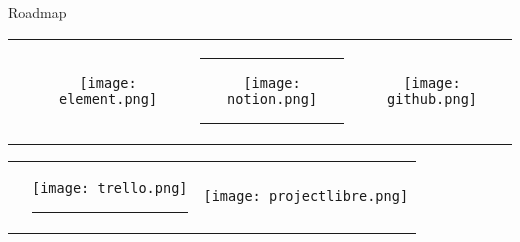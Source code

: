 \begin{frame}[c]{Roadmap}
    \begin{tabular}{cccc}
        \rule{30pt}{0ex}  &   \texttt{[image: element.png]} & \rule{15pt}{0ex} \texttt{[image: notion.png]} \rule{15pt}{0ex}& \texttt{[image: github.png]}\\
    \end{tabular}

    \begin{tabular}{ccc}
        \phantom{The text is invisible} &   \texttt{[image: trello.png]} \rule{5pt}{0ex}& \texttt{[image: projectlibre.png]} \\
    \end{tabular}
\end{frame}
